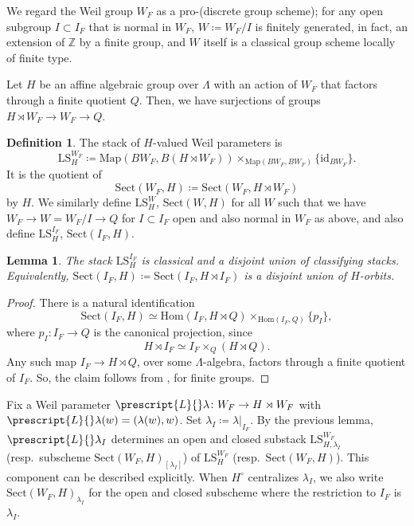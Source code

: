 \documentclass{amsart}
\newtheorem{lemma}[theorem]{Lemma}
\theoremstyle{definition}
\newtheorem{definition}[theorem]{Definition}
\theoremstyle{remark}
\numberwithin{equation}{section}
\newcommand{\Z}{\mathbb{Z}}
\newcommand{\Hom}{\mathrm{Hom}}
\newcommand{\co}[1]{\prescript{#1}{}}
\newcommand{\id}{\mathrm{id}}
\newcommand{\Map}{\mathrm{Map}}
\newcommand{\LS}{\mathrm{LS}}
\newcommand{\Sect}{\mathrm{Sect}}
\begin{document}
We regard the Weil group $W_F$ as a pro-(discrete group scheme); for any open subgroup $I\subset I_F$ that is normal in $W_F$, $W\coloneq W_F/I$ is finitely generated, in fact, an extension of $\Z$ by a finite group, and $W$ itself is a classical group scheme locally of finite type. 

Let $H$ be an affine algebraic group over $\Lambda$ with an action of $W_F$ that factors through a finite quotient $Q$. Then, we have surjections of groups $H\rtimes W_F\to W_F \to Q$. 

\begin{definition}
The stack of $H$-valued Weil parameters is 
\[
\LS^{W_F}_H\coloneq \Map (BW_F, B(H \rtimes W_F))\times_{\Map (BW_F, BW_F)}\{\id_{BW_F}\}. 
\]
It is the quotient of 
\[
\Sect (W_F, H)\coloneq \Sect (W_F, H\rtimes W_F)
\]
by $H$. We similarly define $\LS^W_H$, $\Sect (W, H)$ for all $W$ such that we have $W_F\to W=W_F/I\to Q$ for $I\subset I_F$ open and also normal in $W_F$ as above, and also define $\LS_H^{I_F}$, $\Sect(I_F, H)$.  
\end{definition}

\begin{lemma}
The stack $\LS_H^{I_F}$ is classical and a disjoint union of classifying stacks. Equivalently, $\Sect (I_F, H)\coloneq \Sect (I_F, H\rtimes I_F)$ is a disjoint union of $H$-orbits. 
\end{lemma}

\begin{proof}
There is a natural identification 
\[
\Sect(I_F, H)\simeq \Hom(I_F,H \rtimes Q)\times_{\Hom(I_F, Q)}\{p_I\}, 
\]
where $p_I\colon I_F\to Q$ is the canonical projection, since 
\[
H\rtimes I_F \simeq I_F\times_{Q} (H\rtimes Q).
\]
Any such map $I_F\to H\rtimes Q$, over some $\Lambda$-algebra, factors through a finite quotient of $I_F$. So, the claim follows from \cite[Proposition 2.28]{Zhu}, \cite[Lemma 3.1.8]{HansenMann} for finite groups.
\end{proof}

Fix a Weil parameter $\co{L}\lambda\colon W_F\to H\rtimes W_F$ with $\co{L}\lambda (w)=(\lambda (w), w)$. Set $\lambda_I\coloneq \lambda|_{I_F}$. By the previous lemma, $\co{L}\lambda_I$ determines an open and closed substack $\LS_{H, \lambda_I}^{W_F}$ (resp.~subscheme $\Sect(W_F, H)_{[\lambda_I]}$) of $\LS_H^{W_F}$ (resp.~$\Sect(W_F, H)$). This component can be described explicitly. When $H^\circ$ centralizes $\lambda_I$, we also write $\Sect (W_F, H)_{\lambda_I}$ for the open and closed subscheme where the restriction to $I_F$ is $\lambda_I$. 
\end{document}
